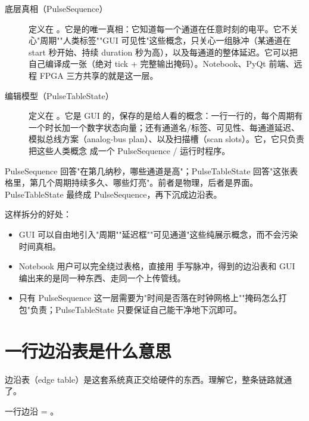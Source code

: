 \documentclass[11pt,oneside,openany]{book}
\begin{document}
\begin{description}
\item[底层真相（PulseSequence）] 定义在 。它是的唯一真相：它知道每一个通道在任意时刻的电平。它不关心"周期""人类标签""GUI 可见性"这些概念，只关心一组脉冲（某通道在 start 秒开始、持续 duration 秒为高），以及每通道的整体延迟。它可以把自己编译成一张（绝对 tick + 完整输出掩码）。Notebook、PyQt 前端、远程 FPGA 三方共享的就是这一层。

\item[编辑模型（PulseTableState）] 定义在 。它是 GUI 的，保存的是给人看的概念：一行一行的，每个周期有一个时长加一个数字状态向量；还有通道名/标签、可见性、每通道延迟、模拟总线方案（analog-bus plan）、以及扫描槽（scan slots）。它，它只负责把这些人类概念  成一个 PulseSequence / 运行时程序。
\end{description}

\begin{notebox}[一句话区分]
PulseSequence 回答"在第几纳秒，哪些通道是高"；PulseTableState 回答"这张表格里，第几个周期持续多久、哪些灯亮"。前者是物理，后者是界面。PulseTableState 最终成 PulseSequence，再下沉成边沿表。
\end{notebox}

这样拆分的好处：
\begin{itemize}
\item GUI 可以自由地引入"周期""延迟框""可见通道"这些纯展示概念，而不会污染时间真相。
\item Notebook 用户可以完全绕过表格，直接用  手写脉冲，得到的边沿表和 GUI 编出来的是同一种东西、走同一个上传管线。
\item 只有 PulseSequence 这一层需要为"时间是否落在时钟网格上""掩码怎么打包"负责；PulseTableState 只要保证自己能干净地下沉即可。
\end{itemize}

\section{一行边沿表是什么意思}

边沿表（edge table）是这套系统真正交给硬件的东西。理解它，整条链路就通了。

一行边沿 = 。
\end{document}
